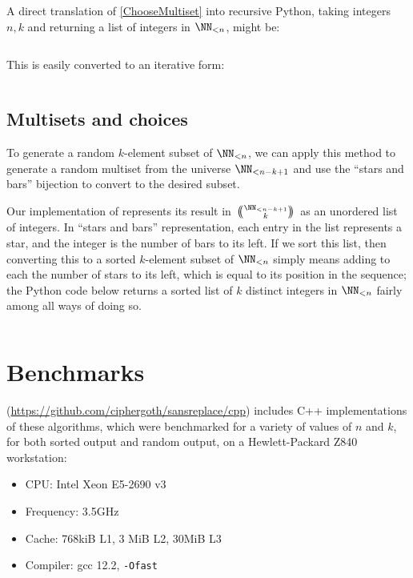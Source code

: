 \documentclass[letterpaper,luatex,11pt]{article}
\newcommand{\multichoose}[2]{
\left.\mathchoice
  {\left(\kern-0.48em\binom{#1}{#2}\kern-0.48em\right)}
  {\big(\kern-0.30em\binom{\smash{#1}}{\smash{#2}}\kern-0.30em\big)}
  {\left(\kern-0.30em\binom{\smash{#1}}{\smash{#2}}\kern-0.30em\right)}
  {\left(\kern-0.30em\binom{\smash{#1}}{\smash{#2}}\kern-0.30em\right)}
\right.}
\begin{document}
A direct translation of \autoref{ChooseMultiset} into recursive 
Python, taking integers $n, k$ and returning a list of
integers in \(\NN_{<n}\), might be:

\inputminted{Python}{code/choose_multiset_recursive.py}

This is easily converted to an iterative form:

\inputminted{Python}{code/choose_multiset.py}

\subsection{Multisets and choices}

To generate a random \(k\)-element subset of \(\NN_{<n}\), we can
apply this method to generate a random multiset from the universe
\(\NN_{<n-k + 1}\) and use the ``stars and bars'' bijection to convert
to the desired subset.

Our implementation of  represents its result
in \(\multichoose{\NN_{<n-k + 1}}{k}\) as an unordered list of
integers. In ``stars and bars'' representation, each entry in the list
represents a star, and the integer is the number of bars to its left.
If we sort this list, then converting this to a sorted \(k\)-element
subset of \(\NN_{<n}\) simply means adding to each the number of stars
to its left, which is equal to its position in the sequence; the
Python code below returns a sorted list of $k$ distinct integers in
\(\NN_{<n}\) fairly among all ways of doing so.

\inputminted{Python}{code/choose_binom.py}

\section{Benchmarks}

(\url{https://github.com/ciphergoth/sansreplace/cpp}) includes C++
implementations of these algorithms, which were benchmarked for a
variety of values of \(n\) and \(k\), for both sorted output and
random output, on a Hewlett-Packard Z840 workstation:

\begin{itemize}
    \item CPU: Intel Xeon E5-2690 v3
    \item Frequency: 3.5GHz
    \item Cache: 768kiB L1, 3 MiB L2, 30MiB L3
    \item Compiler: gcc 12.2, \verb|-Ofast|
\end{itemize}
\end{document}
